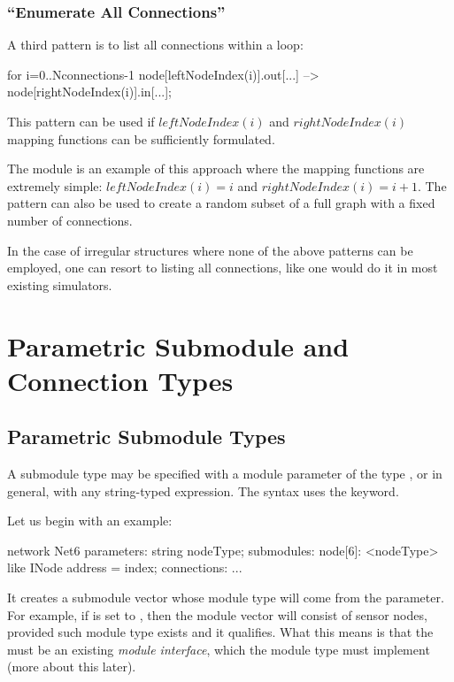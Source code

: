 \subsubsection{``Enumerate All Connections''}
\label{sec:ned-lang:enumerate-all-connections}


A third pattern is to list all connections within a loop:

\begin{ned}
for i=0..Nconnections-1 {
    node[leftNodeIndex(i)].out[...] --> node[rightNodeIndex(i)].in[...];
}
\end{ned}

This pattern can be used if $leftNodeIndex(i)$ and $rightNodeIndex(i)$
mapping functions can be sufficiently formulated.

The  module is an example of this approach where the mapping
functions are extremely simple: $leftNodeIndex(i)=i$ and $rightNodeIndex(i) = i+1$.
The pattern can also be used to create a random subset of a full
graph with a fixed number of connections.

In the case of irregular structures where none of the above patterns
can be employed, one can resort to listing all connections, like one
would do it in most existing simulators.



\section{Parametric Submodule and Connection Types}
\label{sec:ned-lang:parametric-submodule-and-connection-types}

\subsection{Parametric Submodule Types}
\label{sec:ned-lang:submodule-like}

A submodule type may be specified with a module parameter of the type
, or in general, with any string-typed expression.
The syntax uses the  keyword.

Let us begin with an example:

\begin{ned}
network Net6
{
    parameters:
        string nodeType;
    submodules:
        node[6]: <nodeType> like INode {
            address = index;
        }
    connections:
        ...
}
\end{ned}

It creates a submodule vector whose module type will come from the
 parameter. For example, if  is set to ,
then the module vector will consist of sensor nodes, provided such module
type exists and it qualifies. What this means is that the  must be
an existing \textit{module interface}, which the 
module type must implement (more about this later).

